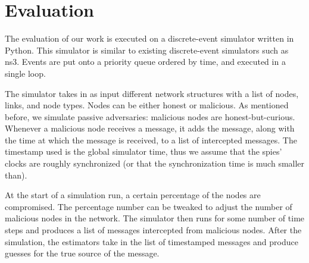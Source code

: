\section{Evaluation}
\label{sec:eval}

The evaluation of our work is executed on a discrete-event simulator written in Python. This simulator is similar to existing discrete-event simulators such as ns3. Events are put onto a priority queue ordered by time, and executed in a single loop.

The simulator takes in as input different network structures with a list of nodes, links, and node types. 
Nodes can be either honest or malicious. As mentioned before, we simulate passive adversaries: malicious nodes are honest-but-curious. Whenever a malicious node receives a message, it adds the message, along with the time at which the message is received, to a list of intercepted messages. The timestamp used is the global simulator time, thus we assume that the spies' clocks are roughly synchronized (or that the synchronization time is much smaller than). 

At the start of a simulation run, a certain percentage of the nodes are compromised. The percentage number can be tweaked to adjust the number of malicious nodes in the network. The simulator then runs for some number of time steps and produces a list of messages intercepted from malicious nodes. After the simulation, the estimators take in the list of timestamped messages and produce guesses for the true source of the message.

